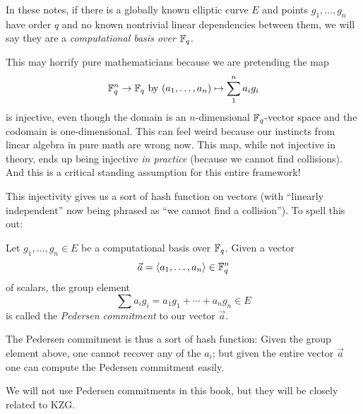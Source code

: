\begin{definition}
\label{comp_basis}
In these notes, if there is a globally known elliptic curve $E$
and points $g_1, \ldots, g_n$ have order $q$ and no known nontrivial
linear dependencies between them,
we will say they are a \emph{computational basis over $\mathbb{F}_q$}.
\end{definition}

\begin{remark}
This may horrify pure mathematicians because we are pretending the map
\[ \mathbb{F}_q^n \rightarrow \mathbb{F}_q \text{ by } (a_1, \ldots, a_n) \mapsto \sum_1^n a_i g_i \]
is injective,
even though the domain is an $n$-dimensional $\mathbb{F}_q$-vector space
and the codomain is one-dimensional.
This can feel weird because our instincts from linear algebra in pure math
are wrong now. This map, while not injective in theory,
ends up being injective \emph{in practice} (because we cannot find collisions).
And this is a critical standing assumption for this entire framework!

\end{remark}

This injectivity gives us a sort of hash function on vectors (with
``linearly independent'' now being phrased as ``we cannot find a
collision''). To spell this out:

\begin{definition}
Let $g_1, \ldots, g_n \in E$ be a computational basis over $\mathbb{F}_q$.
Given a vector
\[ \vec{a} = \langle a_1, \ldots, a_n \rangle \in \mathbb{F}_q^n \] of scalars,
the group element
\[ \sum a_i g_i = a_1 g_1 + \cdots + a_n g_n \in E \]
is called the \emph{Pedersen commitment} to our vector $\vec{a}$.
\end{definition}

The Pedersen commitment is thus a sort of hash function: Given the group
element above, one cannot recover any of the \(a_{i}\); but given the
entire vector \(\overset{\rightarrow}{a}\) one can compute the Pedersen
commitment easily.

We will not use Pedersen commitments in this book, but they will be
closely related to KZG.
